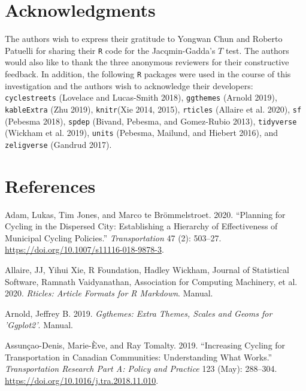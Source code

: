 \documentclass[smallextended]{svjour3}       %
\begin{document}
\hypertarget{sec:acknowledgments}{%
\section{Acknowledgments}\label{sec:acknowledgments}}

The authors wish to express their gratitude to Yongwan Chun and Roberto
Patuelli for sharing their \texttt{R} code for the Jacqmin-Gadda's \(T\)
test. The authors would also like to thank the three anonymous reviewers
for their constructive feedback. In addition, the following \texttt{R}
packages were used in the course of this investigation and the authors
wish to acknowledge their developers: \texttt{cyclestreets} (Lovelace
and Lucas-Smith 2018), \texttt{ggthemes} (Arnold 2019),
\texttt{kableExtra} (Zhu 2019), \texttt{knitr}(Xie 2014, 2015),
\texttt{rticles} (Allaire et al. 2020), \texttt{sf} (Pebesma 2018),
\texttt{spdep} (Bivand, Pebesma, and Gomez-Rubio 2013),
\texttt{tidyverse} (Wickham et al. 2019), \texttt{units} (Pebesma,
Mailund, and Hiebert 2016), and \texttt{zeligverse} (Gandrud 2017).

\hypertarget{references}{%
\section*{References}\label{references}}

\hypertarget{refs}{}
\leavevmode\hypertarget{ref-Adam2020}{}%
Adam, Lukas, Tim Jones, and Marco te Brömmelstroet. 2020. ``Planning for
Cycling in the Dispersed City: Establishing a Hierarchy of Effectiveness
of Municipal Cycling Policies.'' \emph{Transportation} 47 (2): 503--27.
\url{https://doi.org/10.1007/s11116-018-9878-3}.

\leavevmode\hypertarget{ref-Allaire2020}{}%
Allaire, JJ, Yihui Xie, R Foundation, Hadley Wickham, Journal of
Statistical Software, Ramnath Vaidyanathan, Association for Computing
Machinery, et al. 2020. \emph{Rticles: Article Formats for R Markdown}.
Manual.

\leavevmode\hypertarget{ref-Arnold2019}{}%
Arnold, Jeffrey B. 2019. \emph{Ggthemes: Extra Themes, Scales and Geoms
for 'Ggplot2'}. Manual.

\leavevmode\hypertarget{ref-Assuncao2019}{}%
Assunçao-Denis, Marie-Ève, and Ray Tomalty. 2019. ``Increasing Cycling
for Transportation in Canadian Communities: Understanding What Works.''
\emph{Transportation Research Part A: Policy and Practice} 123 (May):
288--304. \url{https://doi.org/10.1016/j.tra.2018.11.010}.
\end{document}
